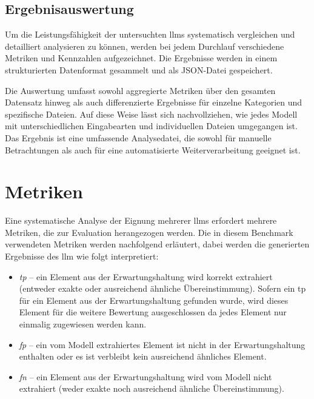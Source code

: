 
\subsection{Ergebnisauswertung}\label{subsec:ergebnisauswertung}

Um die Leistungsfähigkeit der untersuchten \glspl{llm} systematisch vergleichen und detailliert analysieren zu können, werden bei jedem Durchlauf verschiedene Metriken und Kennzahlen aufgezeichnet.
Die Ergebnisse werden in einem strukturierten Datenformat gesammelt und als JSON-Datei gespeichert.

Die Auswertung umfasst sowohl aggregierte Metriken über den gesamten Datensatz hinweg als auch differenzierte Ergebnisse für einzelne Kategorien und spezifische Dateien.
Auf diese Weise lässt sich nachvollziehen, wie jedes Modell mit unterschiedlichen Eingabearten und individuellen Dateien umgegangen ist.
Das Ergebnis ist eine umfassende Analysedatei, die sowohl für manuelle Betrachtungen als auch für eine automatisierte Weiterverarbeitung geeignet ist.


\section{Metriken}\label{sec:metriken-benchmark}

Eine systematische Analyse der Eignung mehrerer \glspl{llm} erfordert mehrere Metriken, die zur Evaluation herangezogen werden.
Die in diesem Benchmark verwendeten Metriken werden nachfolgend erläutert, dabei werden die generierten Ergebnisse des \gls{llm} wie folgt interpretiert:
\begin{itemize}
    \item \textit{\gls{tp}} -- ein Element aus der Erwartungshaltung wird korrekt extrahiert (entweder exakte oder ausreichend ähnliche Übereinstimmung). Sofern ein \gls{tp} für ein Element aus der Erwartungshaltung gefunden wurde, wird dieses Element für die weitere Bewertung ausgeschlossen da jedes Element nur einmalig zugewiesen werden kann.
    \item \textit{\gls{fp}} -- ein vom Modell extrahiertes Element ist nicht in der Erwartungshaltung enthalten oder es ist verbleibt kein ausreichend ähnliches Element.
    \item \textit{\gls{fn}} -- ein Element aus der Erwartungshaltung wird vom Modell nicht extrahiert (weder exakte noch ausreichend ähnliche Übereinstimmung).
\end{itemize}

